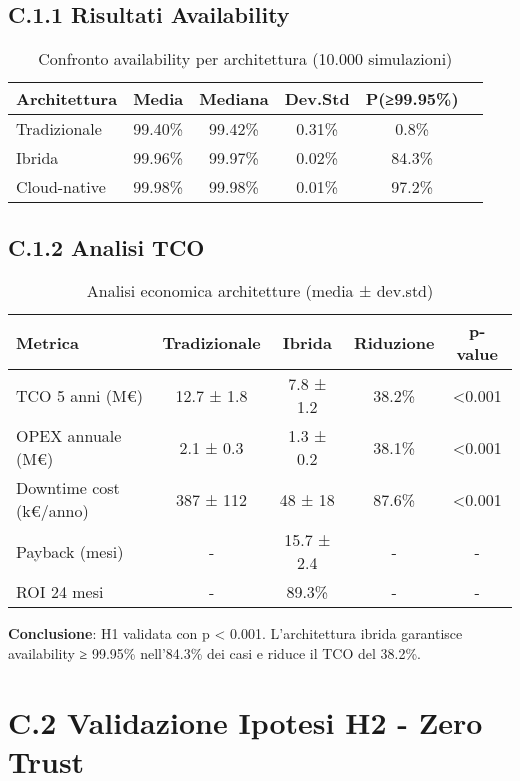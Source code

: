 \subsection{\texorpdfstring{\textbf{C.1.1 Risultati Availability}}{C.1.1 - Risultati Availability}}

\begin{table}[htbp]
\centering
\begin{tabular}{lccccc}
\toprule
\textbf{Architettura} & \textbf{Media} & \textbf{Mediana} & \textbf{Dev.Std} & \textbf{P(≥99.95\%)} \\
\midrule
Tradizionale & 99.40\% & 99.42\% & 0.31\% & 0.8\% \\
Ibrida & 99.96\% & 99.97\% & 0.02\% & 84.3\% \\
Cloud-native & 99.98\% & 99.98\% & 0.01\% & 97.2\% \\
\bottomrule
\end{tabular}
\caption{Confronto availability per architettura (10.000 simulazioni)}
\end{table}

\subsection{\texorpdfstring{\textbf{C.1.2 Analisi TCO}}{C.1.2 - Analisi TCO}}

\begin{table}[htbp]
\centering
\begin{tabular}{lcccc}
\toprule
\textbf{Metrica} & \textbf{Tradizionale} & \textbf{Ibrida} & \textbf{Riduzione} & \textbf{p-value} \\
\midrule
TCO 5 anni (M€) & 12.7 ± 1.8 & 7.8 ± 1.2 & 38.2\% & <0.001 \\
OPEX annuale (M€) & 2.1 ± 0.3 & 1.3 ± 0.2 & 38.1\% & <0.001 \\
Downtime cost (k€/anno) & 387 ± 112 & 48 ± 18 & 87.6\% & <0.001 \\
Payback (mesi) & - & 15.7 ± 2.4 & - & - \\
ROI 24 mesi & - & 89.3\% & - & - \\
\bottomrule
\end{tabular}
\caption{Analisi economica architetture (media ± dev.std)}
\end{table}

\textbf{Conclusione}: H1 validata con p < 0.001. L'architettura ibrida garantisce availability ≥ 99.95\% nell'84.3\% dei casi e riduce il TCO del 38.2\%.

\section{\texorpdfstring{\textbf{C.2 Validazione Ipotesi H2 - Zero Trust}}{C.2 - Validazione Ipotesi H2 - Zero Trust}}

